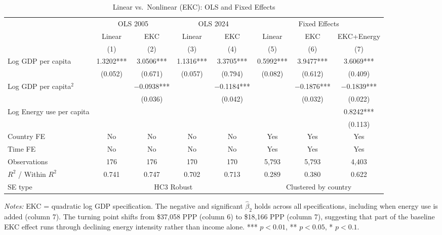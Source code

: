 \documentclass[12pt, a4paper]{article}
\begin{document}
\begin{table}[H]
\centering
\caption{Linear vs.\ Nonlinear (EKC): OLS and Fixed Effects}
\label{tab:ekc_main}
\begin{adjustbox}{max width=\textwidth}
\begin{threeparttable}
\small
\setlength{\tabcolsep}{5pt}
\begin{tabular}{lccccccc}
\toprule
 & \multicolumn{2}{c}{OLS 2005} & \multicolumn{2}{c}{OLS 2024} & \multicolumn{3}{c}{Fixed Effects} \\
\cmidrule(lr){2-3}\cmidrule(lr){4-5}\cmidrule(lr){6-8}
 & Linear & EKC & Linear & EKC & Linear & EKC & EKC+Energy \\
 & (1) & (2) & (3) & (4) & (5) & (6) & (7) \\
\midrule
Log GDP per capita
    & 1.3202*** & 3.0506***  & 1.1316*** & 3.3705***  & 0.5992*** & 3.9477*** & 3.6069*** \\
    & (0.052)   & (0.671)    & (0.057)   & (0.794)    & (0.082)   & (0.612)   & (0.409)   \\[4pt]
Log GDP per capita$^2$
    &           & $-$0.0938*** &         & $-$0.1184*** &         & $-$0.1876*** & $-$0.1839*** \\
    &           & (0.036)    &           & (0.042)    &           & (0.032)   & (0.022)   \\[4pt]
Log Energy use per capita
    &           &            &           &            &           &           & 0.8242*** \\
    &           &            &           &            &           &           & (0.113)   \\
\midrule
Country FE     & No    & No    & No    & No    & Yes   & Yes   & Yes   \\
Time FE        & No    & No    & No    & No    & Yes   & Yes   & Yes   \\
Observations   & 176   & 176   & 170   & 170   & 5,793 & 5,793 & 4,403 \\
$R^2$ / Within $R^2$ & 0.741 & 0.747 & 0.702 & 0.713 & 0.289 & 0.380 & 0.622 \\
SE type        & \multicolumn{4}{c}{HC3 Robust} & \multicolumn{3}{c}{Clustered by country} \\
\bottomrule
\end{tabular}
\begin{tablenotes}
\small
\item \textit{Notes:} EKC = quadratic log GDP specification. The negative and significant $\hat{\beta}_2$ holds across all specifications, including when energy use is added (column 7). The turning point shifts from \$37,058 PPP (column 6) to \$18,166 PPP (column 7), suggesting that part of the baseline EKC effect runs through declining energy intensity rather than income alone. *** $p<0.01$, ** $p<0.05$, * $p<0.1$.
\end{tablenotes}
\end{threeparttable}
\end{adjustbox}
\end{table}
 
\end{document}
